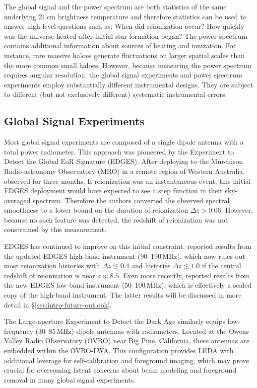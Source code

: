 \begin{bibunit}
The global signal and the power spectrum are both statistics of the same underlying 21\,cm
brightness temperature and therefore statistics can be used to answer high-level questions such as:
When did reionization occur? How quickly was the universe heated after initial star formation began?
The power spectrum contains additional information about sources of heating and ionization. For
instance, rare massive haloes generate fluctuations on larger spatial scales than the more common
small haloes.  However, because measuring the power spectrum requires angular resolution, the global
signal experiments and power spectrum experiments employ substantially different instrumental
designs. They are subject to different (but not exclusively different) systematic instrumental
errors.

\subsection{Global Signal Experiments}

Most global signal experiments are composed of a single dipole antenna with a total power
radiometer. This approach was pioneered by the Experiment to Detect the Global EoR Signature
(EDGES). After deploying to the Murchison Radio-astronomy Observatory (MRO) in a remote region of
Western Australia, \citet{2010Natur.468..796B} observed for three months. If reionization was an
instantaneous event, this initial EDGES deployment would have expected to see a step function in
their sky-averaged spectrum. Therefore the authors converted the observed spectral smoothness to a
lower bound on the duration of reionization $\Delta z > 0.06$. However, because no such feature was
detected, the redshift of reionization was not constrained by this measurement.

EDGES has continued to improve on this initial constraint.  \citet{2017ApJ...847...64M} reported
results from the updated EDGES high-band instrument (90--190\,MHz), which now rules out most
reionization histories with $\Delta z \lesssim 0.4$ and histories $\Delta z \lesssim 1.0$ if the
central redshift of reionization is near $z\approx 8.5$. Even more recently,
\citet{2018Natur.555...67B} reported results from the new EDGES low-band instrument (50--100\,MHz),
which is effectively a scaled copy of the high-band instrument. The latter results will be discussed
in more detail in \S\ref{sec:intro-future-outlook}.

The Large-aperture Experiment to Detect the Dark Age \citep[LEDA;][]{2018MNRAS.478.4193P} similarly
equips low-frequency (30--85\,MHz) dipole antennas with radiometers. Located at the Owens Valley
Radio Observatory (OVRO) near Big Pine, California, these antennas are embedded within the OVRO-LWA.
This configuration provides LEDA with additional leverage for self-calibration and foreground
imaging, which may prove crucial for overcoming latent concerns about beam modeling and foreground
removal in many global signal experiments.


\end{bibunit}
